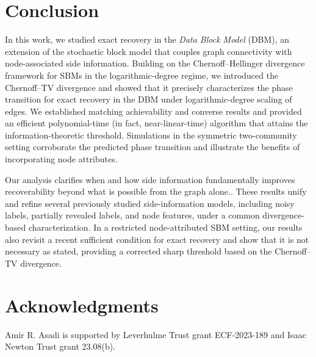 \documentclass[11pt]{article}
\theoremstyle{plain}
\theoremstyle{definition}
\begin{document}
\section{Conclusion}\label{sec:conclusion}

In this work, we studied 
{exact recovery in the \emph{Data Block Model} (DBM), an extension of the stochastic block model that couples graph connectivity with node-associated side information.} Building on the Chernoff--Hellinger divergence framework { for SBMs in the logarithmic-degree regime}, we introduced the Chernoff--TV divergence and showed that it precisely characterizes the phase transition for exact recovery in the DBM under logarithmic-degree scaling of edges. We established matching achievability and converse results and provided an efficient { polynomial-time (in fact, near-linear-time) } algorithm that attains the information-theoretic threshold. {Simulations in the symmetric two-community setting corroborate the predicted phase transition and illustrate the benefits of incorporating node attributes.}


Our analysis clarifies when and how side information fundamentally improves recoverability { beyond what is possible from the graph alone.}.  
These results unify and refine several previously studied { side-information} models, including noisy labels, partially revealed labels, and node features, under a common divergence-based characterization. In a restricted {node-attributed SBM} setting, our results also revisit a recent sufficient condition for exact recovery and show that it is not necessary as stated, providing a corrected {sharp} threshold based on the Chernoff--TV divergence.

\section*{Acknowledgments}
Amir R. Asadi is supported by Leverhulme Trust grant ECF-2023-189 and
Isaac Newton Trust grant 23.08(b).

\clearpage


\end{document}
